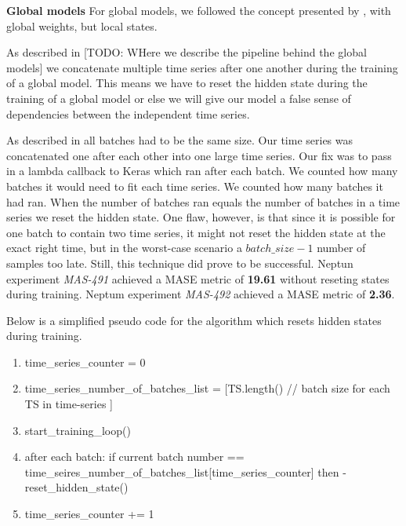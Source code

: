\textbf{Global models}
For global models, we followed the concept presented by \cite{Smyl2020},
with global weights, but local states.

As described in [TODO: WHere we describe the pipeline behind the global models]
we concatenate multiple time series after one another during the training of a global model.
This means we have to reset the hidden state during the training of a global model
or else we will give our model a false sense of dependencies between
the independent time series.

As described in  all
batches had to be the same size. Our time series was concatenated one after
each other into one large time series.
Our fix was to pass in a lambda callback to Keras which ran after each batch.
We counted how many batches it would need to fit each time series.
We counted how many batches it had ran. When the number of batches ran equals
the number of batches in a time series we reset the hidden state.
One flaw, however, is that since it is possible for one batch to
contain two time series, it might not reset the hidden state at the exact
right time, but in the worst-case scenario a $batch\_size - 1$ number of
samples too late. Still, this technique did prove to be successful.
Neptun experiment \textit{MAS-491} achieved a MASE metric of \textbf{19.61}
without reseting states during training.
Neptum experiment \textit{MAS-492} achieved a MASE metric of \textbf{2.36}.

Below is a simplified pseudo code for the algorithm which resets hidden states
during training.
\begin{enumerate}
  \item time\_series\_counter = 0
  \item time\_series\_number\_of\_batches\_list = [TS.length() // batch size for each TS in time-series ]
  \item start\_training\_loop()
  \item after each batch: if current batch number ==
        time\_seires\_number\_of\_batches\_list[time\_series\_counter]
        then -\> reset\_hidden\_state()
  \item time\_series\_counter += 1
\end{enumerate}







